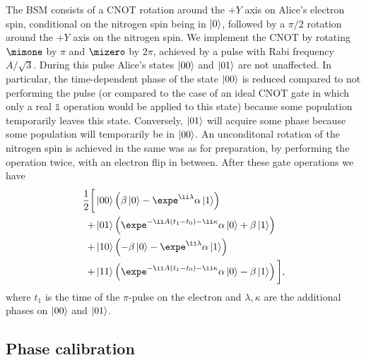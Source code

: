 The BSM consists of a CNOT rotation around the $+Y$ axis on Alice's electron spin, conditional on the nitrogen spin being in $\left|0\right>$, followed by a $\pi/2$ rotation around the $+Y$ axis on the nitrogen spin. We implement the CNOT by rotating $\mimone$ by $\pi$ and $\mizero$ by $2\pi$, achieved by a pulse with Rabi frequency $A/\sqrt{3}$. During this pulse Alice's states $\left|00\right>$ and $\left|01\right>$ are not unaffected. In particular, the time-dependent phase of the state $\left|00\right>$ is reduced compared to not performing the pulse (or compared to the case of an ideal CNOT gate in which only a real $\mathbb{1}$ operation would be applied to this state) because some population temporarily leaves this state. Conversely, $\left|01\right>$ will acquire some phase because some population will temporarily be in $\left|00\right>$. An unconditonal rotation of the nitrogen spin is achieved in the same was as for preparation, by performing the operation twice, with an electron flip in between. After these gate operations we have
\begin{align}
    \frac{1}{2} \bigg[
          & \ket{00} \left( \beta\ket0 - 
            \expe^{\ii\lambda}\alpha\ket1 \right) \notag\\
        + & \ket{01} \left( \expe^{-\ii A(t_1-t_0)-\ii\kappa}\alpha\ket0 +
            \beta\ket1 \right) \notag\\
        + & \ket{10} \left( -\beta\ket0 - 
            \expe^{\ii\lambda}\alpha\ket1 \right) \notag\\
        + & \ket{11} \left( \expe^{-\ii A(t_1-t_0)-\ii\kappa}\alpha\ket0 -
            \beta\ket1 \right)
    \bigg],
\end{align}
where $t_1$ is the time of the $\pi$-pulse on the electron and $\lambda,\kappa$ are the additional phases on $\left|00\right>$ and $\left|01\right>$.

\subsection{Phase calibration}

